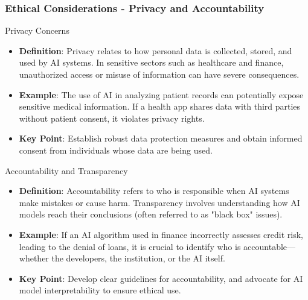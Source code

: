 \documentclass[aspectratio=169]{beamer}
\begin{document}
\begin{frame}[fragile]
    \frametitle{Ethical Considerations - Privacy and Accountability}
    \begin{block}{Privacy Concerns}
        \begin{itemize}
            \item \textbf{Definition}: Privacy relates to how personal data is collected, stored, and used 
            by AI systems. In sensitive sectors such as healthcare and finance, unauthorized access 
            or misuse of information can have severe consequences.
            
            \item \textbf{Example}: The use of AI in analyzing patient records can potentially expose 
            sensitive medical information. If a health app shares data with third parties without patient 
            consent, it violates privacy rights.
            
            \item \textbf{Key Point}: Establish robust data protection measures and obtain informed 
            consent from individuals whose data are being used.
        \end{itemize}
    \end{block}

    \begin{block}{Accountability and Transparency}
        \begin{itemize}
            \item \textbf{Definition}: Accountability refers to who is responsible when AI systems make 
            mistakes or cause harm. Transparency involves understanding how AI models reach their 
            conclusions (often referred to as "black box" issues).
            
            \item \textbf{Example}: If an AI algorithm used in finance incorrectly assesses credit risk, 
            leading to the denial of loans, it is crucial to identify who is accountable—whether the 
            developers, the institution, or the AI itself.
            
            \item \textbf{Key Point}: Develop clear guidelines for accountability, and advocate for AI 
            model interpretability to ensure ethical use.
        \end{itemize}
    \end{block}
\end{frame}
\end{document}
